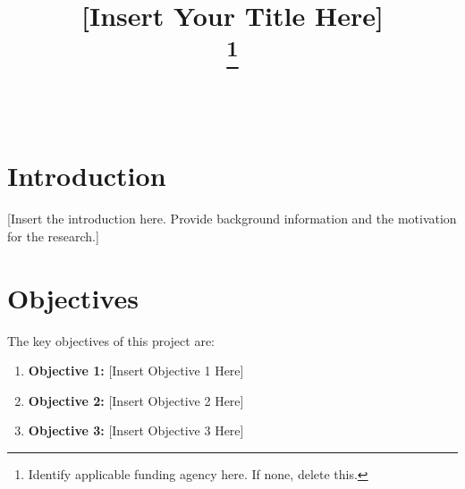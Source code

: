 \documentclass[conference]{IEEEtran}
\begin{document}
	
	\title{[Insert Your Title Here]\\
		\thanks{Identify applicable funding agency here. If none, delete this.}
	}
	
	\author{
		\and
		\and
	}
	
	\maketitle
	
	\begin{abstract}
		\\
		[Insert Abstract Here: Provide a brief summary of the project, methods, and key results.]
	\end{abstract}
	
	\section{Introduction}
	
	[Insert the introduction here. Provide background information and the motivation for the research.]
	
	\section{Objectives}
	
	The key objectives of this project are:
	
	\begin{enumerate}
		\item \textbf{Objective 1:} [Insert Objective 1 Here]
		\item \textbf{Objective 2:} [Insert Objective 2 Here]
		\item \textbf{Objective 3:} [Insert Objective 3 Here]
	\end{enumerate}
	
\end{document}
